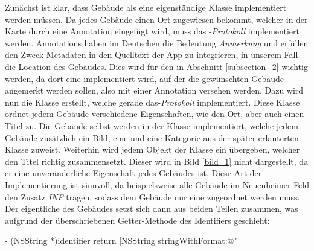\documentclass{report}
\begin{document}
Zunächst ist klar, dass Gebäude als eine eigenständige Klasse implementiert werden müssen. Da jedes Gebäude einen Ort zugewiesen bekommt, welcher in der Karte durch eine Annotation eingefügt wird, muss das -\emph{Protokoll} implementiert werden. Annotations haben im Deutschen die Bedeutung \emph{Anmerkung} und erfüllen den Zweck Metadaten in den Quelltext der App zu integrieren, in unserem Fall die Location des Gebäudes. Dies wird für den  in Abschnitt \ref{subsection_2} wichtig werden, da dort eine  implementiert wird, auf der die gewünschten Gebäude angemerkt werden sollen, also mit einer Annotation versehen werden. Dazu wird nun die Klasse  erstellt, welche gerade das-\emph{Protokoll} implementiert. Diese Klasse ordnet jedem Gebäude verschiedene Eigenschaften, wie den Ort, aber auch einen Titel zu. Die Gebäude selbst werden in der Klasse  implementiert, welche jedem Gebäude zusätzlich ein Bild, eine  und eine Kategorie aus der später erläuterten Klasse  zuweist. Weiterhin wird jedem Objekt der Klasse ein  übergeben, welcher den Titel richtig zusammensetzt. Dieser wird in Bild \ref{bild_1} nicht dargestellt, da er eine unveränderliche Eigenschaft jedes Gebäudes ist. Diese Art der Implementierung ist sinnvoll, da beispielsweise alle Gebäude im Neuenheimer Feld den Zusatz \emph{INF} tragen, sodass dem Gebäude nur eine  zugeordnet werden muss. Der eigentliche  des Gebäudes setzt sich dann aus beiden Teilen zusammen, was aufgrund der überschriebenen Getter-Methode des Identifiers geschieht:

\begin{objclst}
- (NSString *)identifier {
    return [NSString stringWithFormat:@"%
}
\end{objclst}
\end{document}

